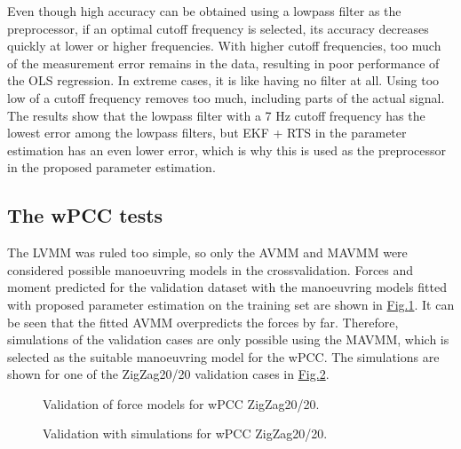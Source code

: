 \documentclass[review]{elsarticle}
\begin{document}
\sphinxAtStartPar
Even though high accuracy can be obtained using a low\sphinxhyphen{}pass filter as the pre\sphinxhyphen{}processor, if an optimal cut\sphinxhyphen{}off frequency is selected, its accuracy decreases quickly at lower or higher frequencies. With higher cut\sphinxhyphen{}off frequencies, too much of the measurement error remains in the data, resulting in poor performance of the OLS regression. In extreme cases, it is like having no filter at all. Using too low of a cut\sphinxhyphen{}off frequency removes too much, including parts of the actual signal. The results show that the low\sphinxhyphen{}pass filter with a 7 Hz cut\sphinxhyphen{}off frequency has the lowest error among the low\sphinxhyphen{}pass filters, but EKF + RTS in the parameter estimation has an even lower error, which is why this is used as the preprocessor in the proposed parameter estimation.


\subsection{The wPCC tests}
\label{\detokenize{06.10_results_wpcc:the-wpcc-tests}}\label{\detokenize{06.10_results_wpcc::doc}}
\sphinxAtStartPar
The LVMM was ruled too simple, so only the AVMM and MAVMM were considered possible manoeuvring models in the cross\sphinxhyphen{}validation.
Forces and moment predicted for the validation dataset with the manoeuvring models fitted with proposed parameter estimation on the training set are shown in \hyperref[\detokenize{06.10_results_wpcc:fig-validation-forces}]{Fig.\@ \ref{\detokenize{06.10_results_wpcc:fig-validation-forces}}}. It can be seen that the fitted AVMM overpredicts the forces by far. Therefore, simulations of the validation cases are only possible using the MAVMM, which is selected as the suitable manoeuvring model for the wPCC.
The simulations are shown for one of the ZigZag20/20 validation cases in \hyperref[\detokenize{06.10_results_wpcc:fig-validation-sim}]{Fig.\@ \ref{\detokenize{06.10_results_wpcc:fig-validation-sim}}}.

\begin{figure}[H]
\centering
\capstart

\noindent{}
\caption{Validation of force models for wPCC ZigZag20/20.}\label{\detokenize{06.10_results_wpcc:fig-validation-forces}}\end{figure}

\begin{figure}[H]
\centering
\capstart

\noindent{}
\caption{Validation with simulations for wPCC ZigZag20/20.}\label{\detokenize{06.10_results_wpcc:fig-validation-sim}}\end{figure}
\end{document}
